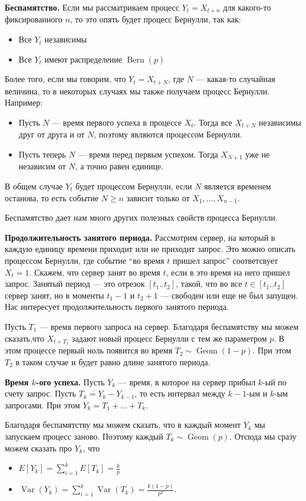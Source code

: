 \documentclass[12pt]{article}
\DeclareMathOperator{\Geom}{Geom}
\DeclareMathOperator{\Bern}{Bern}
\DeclareMathOperator{\Var}{Var}
\begin{document}
\textbf{Беспамятство.} Если мы рассматриваем процесс $Y_t = X_{t + n}$ для какого-то фиксированного $n$, то это опять будет процесс Бернулли, так как:
\begin{itemize}
  \item Все $Y_t$ независимы
  \item Все $Y_t$ имеют распределение $\Bern(p)$
\end{itemize}

Более того, если мы говорим, что $Y_t = X_{t + N}$, где $N$ --- какая-то случайная величина, то в некоторых случаях мы также получаем процесс Бернулли. Например:
\begin{itemize}
  \item Пусть $N$ --- время первого успеха в процессе $X_t$. Тогда все $X_{t + N}$ независимы друг от друга и от $N$, поэтому являются процессом Бернулли.
  \item Пусть теперь $N$ --- время перед первым успехом. Тогда $X_{N + 1}$ уже не независим от $N$, а точно равен единице. 
\end{itemize}
В общем случае $Y_t$ будет процессом Бернулли, если $N$ является временем останова, то есть событие $N \ge n$ зависит только от $X_1, \dots, X_{n - 1}$.

Беспамятство дает нам много других полезных свойств процесса Бернулли.

\textbf{Продолжительность занятого периода.} Рассмотрим сервер, на который в каждую единицу времени приходит или не приходит запрос. Это можно описать процессом Бернулли, где событие ``во время $t$ пришел запрос'' соответсвует $X_t = 1$. Скажем, что сервер занят во время $t$, если в это время на него пришел запрос. Занятый период --- это отрезок $[t_1..t_2]$, такой, что во все $t \in [t_1..t_2]$ сервер занят, но в моменты $t_1 - 1$ и $t_2 + 1$ --- свободен или еще не был запущен. Нас интересует продолжительность первого занятого периода.

Пусть $T_1$ --- время первого запроса на сервер. Благодаря беспамятству мы можем сказать,что $X_{t + T_1}$ задают новый процесс Бернулли с тем же параметром $p$. В этом процессе первый ноль появится во время $T_2 \sim \Geom(1 - p)$. При этом $T_2$ в таком случае и будет равно длине занятого периода.

\textbf{Время $k$-ого успеха.} Пусть $Y_k$ --- время, в которое на сервер прибыл $k$-ый по счету запрос. Пусть $T_k = Y_k - Y_{k - 1}$, то есть интервал между $k-1$-ым и $k$-ым запросами. При этом $Y_k = T_1 + \dots + T_k$.

Благодаря беспамятству мы можем сказать, что в каждый момент $Y_k$ мы запускаем процесс заново. Поэтому каждый $T_k \sim \Geom(p)$. Отсюда мы сразу можем сказать про $Y_k$, что
\begin{itemize}
  \item $E[Y_k] = \sum_{i = 1}^k E[T_k] = \frac{k}{p}$
  \item $\Var(Y_k) = \sum_{i = 1}^k \Var(T_k) = \frac{k(1 - p)}{p^2}$.
\end{itemize}
\end{document}
